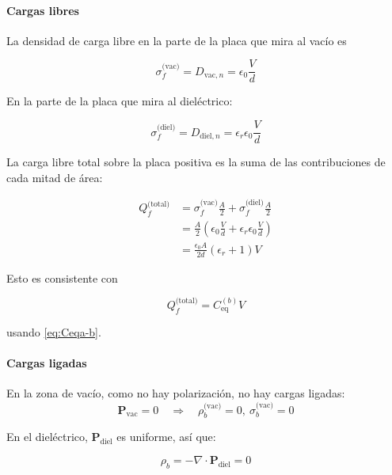 \documentclass{article}
\begin{document}
\paragraph{Cargas libres}

La densidad de carga libre en la parte de la placa que mira al vacío es

\begin{equation}
\sigma_{f}^{\text{(vac)}} = D_{\text{vac},n}
= \epsilon_{0}\frac{V}{d}
\label{eq:sigma-f-vac-b}
\end{equation}

En la parte de la placa que mira al dieléctrico:

\begin{equation}
\sigma_{f}^{\text{(diel)}} = D_{\text{diel},n}
= \epsilon_{r}\epsilon_{0}\frac{V}{d}
\label{eq:sigma-f-diel-b}
\end{equation}

La carga libre total sobre la placa positiva es la suma de las contribuciones de cada mitad de área:

\begin{align}
Q_{f}^{\text{(total)}} 
&= \sigma_{f}^{\text{(vac)}}\frac{A}{2}
 + \sigma_{f}^{\text{(diel)}}\frac{A}{2}\\[4pt]
&= \frac{A}{2}\left(\epsilon_{0}\frac{V}{d}
 + \epsilon_{r}\epsilon_{0}\frac{V}{d}\right)\\[4pt]
&= \frac{\epsilon_{0}A}{2d}(\epsilon_{r}+1)V
\label{eq:Qf-total-b}
\end{align}

Esto es consistente con

\[
Q_{f}^{\text{(total)}} = C_{\text{eq}}^{(b)}V
\]

usando \eqref{eq:Ceqa-b}.

\paragraph{Cargas ligadas}

En la zona de vacío, como no hay polarización, no hay cargas ligadas:
\[
\mathbf{P}_{\text{vac}} = 0 
\quad\Rightarrow\quad 
\rho_{b}^{\text{(vac)}} = 0,\ \sigma_{b}^{\text{(vac)}} = 0
\]

En el dieléctrico, $\mathbf{P}_{\text{diel}}$ es uniforme, así que:

\begin{equation}
\rho_{b} = -\nabla\cdot\mathbf{P}_{\text{diel}} = 0
\label{eq:rho-b-b}
\end{equation}
\end{document}
